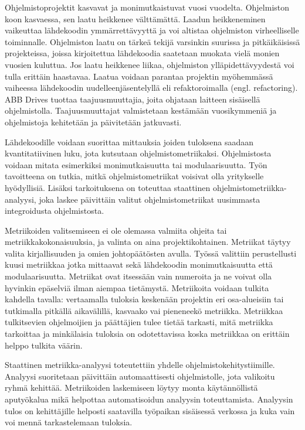 \begin{spacing}{1.05}

\vspace{.8mm}

{\small
Ohjelmistoprojektit kasvavat ja monimutkaistuvat vuosi vuodelta. Ohjelmiston koon kasvaessa, sen laatu heikkenee välttämättä. Laadun heikkeneminen vaikeuttaa lähdekoodin ymmärrettävyyttä ja  voi altistaa ohjelmiston virheelliselle toiminnalle. Ohjelmiston laatu on tärkeä tekijä varsinkin suurissa ja pitkäikäisissä projekteissa, joissa kirjoitettua lähdekoodia saatetaan muokata vielä monien vuosien kuluttua. Jos laatu heikkenee liikaa, ohjelmiston ylläpidettävyydestä voi tulla erittäin haastavaa. Laatua voidaan parantaa projektin myöhemmässä vaiheessa lähdekoodin uudelleenjäsentelyllä eli refaktoroimalla (engl. refactoring).
ABB Drives tuottaa taajuusmuuttajia, joita ohjataan laitteen sisäisellä ohjelmistolla. Taajuusmuuttajat valmistetaan kestämään vuosikymmeniä ja ohjelmistoja kehitetään ja päivitetään jatkuvasti.
         
Lähdekoodille voidaan suorittaa mittauksia joiden tuloksena saadaan kvantitatiivinen luku, jota kutsutaan ohjelmistometriikaksi. Ohjelmistosta voidaan mitata esimerkiksi monimutkaisuutta tai modulaarisuutta. Työn tavoitteena on tutkia, mitkä ohjelmistometriikat voisivat olla yritykselle hyödyllisiä. Lisäksi tarkoituksena on toteuttaa staattinen ohjelmistometriikka-analyysi,  joka laskee päivittäin valitut ohjelmistometriikat uusimmasta integroidusta ohjelmistosta. 
        
Metriikoiden valitsemiseen ei ole olemassa valmiita ohjeita tai metriikkakokonaisuuksia, ja  valinta on aina projektikohtainen. Metriikat täytyy valita kirjallisuuden ja omien johtopäätösten avulla. Työssä valittiin perustellusti kuusi metriikkaa jotka mittaavat sekä lähdekoodin monimutkaisuutta että modulaarisuutta. Metriikat ovat itsessään vain numeroita ja ne voivat olla hyvinkin epäselviä ilman aiempaa tietämystä. Metriikoita voidaan tulkita kahdella tavalla: vertaamalla tuloksia keskenään projektin eri osa-alueisiin tai tutkimalla pitkällä aikavälillä, kasvaako vai pieneneekö metriikka. Metriikkaa tulkitsevien ohjelmoijien ja päättäjien tulee tietää tarkasti, mitä metriikka tarkoittaa ja minkälaisia tuloksia on odotettavissa koska metriikkaa on erittäin helppo tulkita väärin.

Staattinen metriikka-analyysi toteutettiin yhdelle ohjelmistokehitystiimille. Analyysi suoritetaan päivittäin automaattisesti ohjelmistolle, jota valikoitu ryhmä kehittää. Metriikoiden laskemiseen löytyy monta käytännöllistä aputyökalua mikä helpottaa automatisoidun analyysin toteuttamista. Analyysin tulos on kehittäjille helposti saatavilla työpaikan sisäisessä verkossa ja kuka vain voi mennä tarkastelemaan tuloksia. 

}
\end{spacing}
